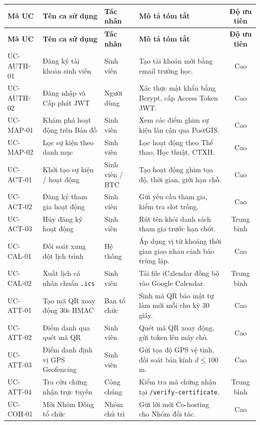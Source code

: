 \begin{xltabular}{\textwidth}{|l|p{4.2cm}|l|X|c|}
\hline
\textbf{Mã UC} & \textbf{Tên ca sử dụng} & \textbf{Tác nhân} & \textbf{Mô tả tóm tắt} & \textbf{Độ ưu tiên} \\ \hline
\endfirsthead
\hline
\textbf{Mã UC} & \textbf{Tên ca sử dụng} & \textbf{Tác nhân} & \textbf{Mô tả tóm tắt} & \textbf{Độ ưu tiên} \\ \hline
\endhead
\hline
\endfoot
\hline
\endlastfoot
UC-AUTH-01 & Đăng ký tài khoản sinh viên & Sinh viên & Tạo tài khoản mới bằng email trường học. & Cao \\ \hline
UC-AUTH-02 & Đăng nhập và Cấp phát JWT & Người dùng & Xác thực mật khẩu bằng Bcrypt, cấp Access Token JWT. & Cao \\ \hline
UC-MAP-01 & Khám phá hoạt động trên Bản đồ & Sinh viên & Xem các điểm ghim sự kiện lân cận qua PostGIS. & Cao \\ \hline
UC-MAP-02 & Lọc sự kiện theo danh mục & Sinh viên & Lọc hoạt động theo Thể thao, Học thuật, CTXH. & Cao \\ \hline
UC-ACT-01 & Khởi tạo sự kiện / hoạt động & Sinh viên / BTC & Tạo hoạt động ghim tọa độ, thời gian, giới hạn chỗ. & Cao \\ \hline
UC-ACT-02 & Đăng ký tham gia hoạt động & Sinh viên & Gửi yêu cầu tham gia, kiểm tra slot trống. & Cao \\ \hline
UC-ACT-03 & Hủy đăng ký hoạt động & Sinh viên & Rút tên khỏi danh sách tham gia trước hạn chót. & Trung bình \\ \hline
UC-CAL-01 & Đối soát xung đột lịch trình & Hệ thống & Áp dụng vị từ khoảng thời gian giao nhau cảnh báo trùng lặp. & Cao \\ \hline
UC-CAL-02 & Xuất lịch cá nhân chuẩn \texttt{.ics} & Sinh viên & Tải file iCalendar đồng bộ vào Google Calendar. & Trung bình \\ \hline
UC-ATT-01 & Tạo mã QR xoay động 30s HMAC & Ban tổ chức & Sinh mã QR bảo mật tự làm mới mỗi chu kỳ 30 giây. & Cao \\ \hline
UC-ATT-02 & Điểm danh qua quét mã QR & Sinh viên & Quét mã QR xoay động, gửi token lên máy chủ. & Cao \\ \hline
UC-ATT-03 & Điểm danh định vị GPS Geofencing & Sinh viên & Gửi tọa độ GPS vệ tinh, đối soát bán kính $d \le 100$m. & Cao \\ \hline
UC-ATT-04 & Tra cứu chứng nhận trực tuyến & Công chúng & Kiểm tra mã chứng nhận tại \texttt{/verify-certificate}. & Trung bình \\ \hline
UC-COH-01 & Mời Nhóm Đồng tổ chức & Nhóm chủ trì & Gửi lời mời Co-hosting cho Nhóm đối tác. & Cao \\ \hline

\end{xltabular}
